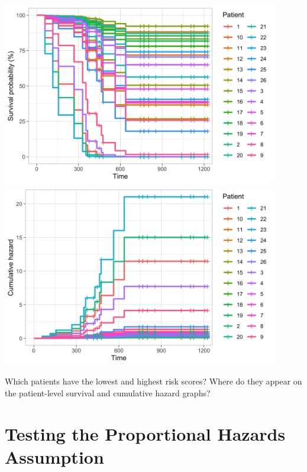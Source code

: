 \begin{center}
\includegraphics[width=0.9\textwidth]{img/ovarian-survplot-bypatient.png}\\
\includegraphics[width=0.9\textwidth]{img/ovarian-cumhaz-bypatient.png}
\end{center}

\newpage

\begin{question}{}
Which patients have the lowest and highest risk scores? Where do they appear on the patient-level survival and cumulative hazard graphs?
\end{question}


\section{Testing the Proportional Hazards Assumption}

